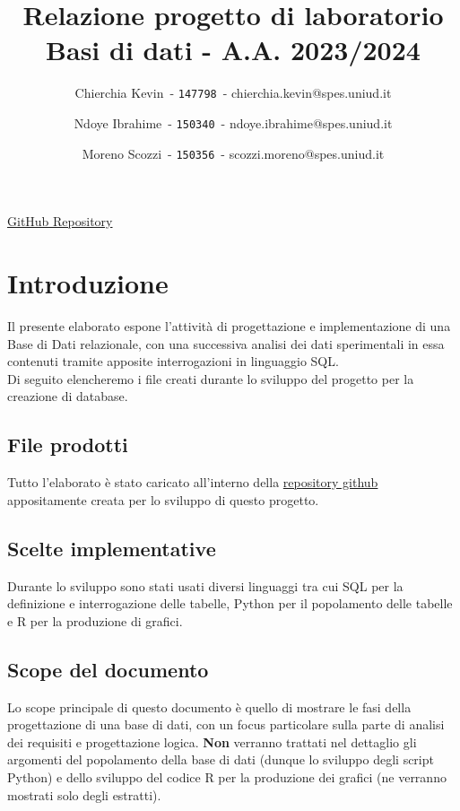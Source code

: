 \documentclass{article}
\title{Relazione progetto di laboratorio \\ Basi di dati - A.A. 2023/2024}
\author{
    Chierchia Kevin\ -
	\texttt{147798}\ -
	{chierchia.kevin@spes.uniud.it}
    \and
	Ndoye Ibrahime\ -
	\texttt{150340}\ -
	{ndoye.ibrahime@spes.uniud.it}
	\and
	Moreno Scozzi\ -
	\texttt{150356}\ -
	{scozzi.moreno@spes.uniud.it}
	}
\begin{document}
\setlength{\parindent}{25pt}
\setlength{\parskip}{5pt}
\graphicspath{{./img/}}
\maketitle
{
    \centering\href{https://github.com/kevchi9/uniud_db24}{GitHub Repository}
    \newpage
    \hypersetup{linkcolor=black}
    \tableofcontents

}

\newpage

\section{Introduzione}
Il presente elaborato espone l’attività di progettazione e implementazione di una Base di Dati relazionale, con una
successiva analisi dei dati sperimentali in essa contenuti tramite apposite interrogazioni in linguaggio SQL. \\
Di seguito elencheremo i file creati durante lo sviluppo del progetto per la creazione di database. \\

\subsection{File prodotti}
Tutto l'elaborato è stato caricato all'interno della \href{https://github.com/kevchi9/uniud_db24/}{repository github} appositamente creata per lo sviluppo di questo progetto.

\subsection{Scelte implementative}
Durante lo sviluppo sono stati usati diversi linguaggi tra cui SQL per la definizione e interrogazione delle tabelle, Python per il popolamento delle tabelle e R per la produzione di grafici.

\subsection{Scope del documento}
Lo scope principale di questo documento è quello di mostrare le fasi della progettazione di una base di dati, con un focus particolare sulla parte di analisi dei requisiti e progettazione logica. \textbf{Non} verranno trattati nel dettaglio gli argomenti del popolamento della base di dati (dunque lo sviluppo degli script Python) e dello sviluppo del codice R per la produzione dei grafici (ne verranno mostrati solo degli estratti). 
\end{document}
